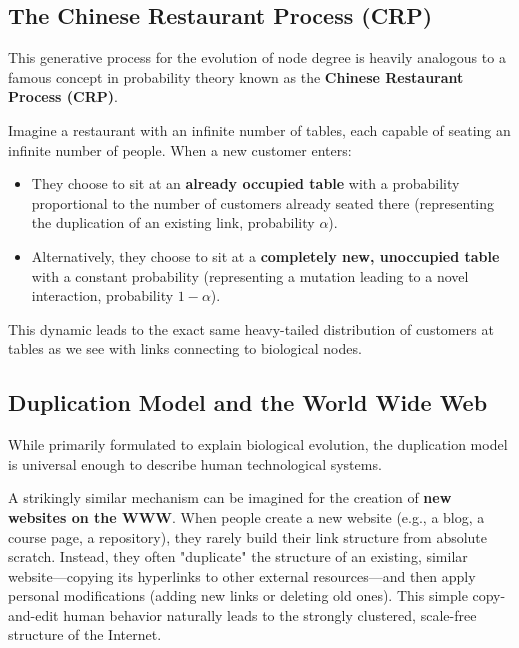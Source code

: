 \subsection{The Chinese Restaurant Process (CRP)}
This generative process for the evolution of node degree is heavily analogous to a famous concept in probability theory known as the \textbf{Chinese Restaurant Process (CRP)}.

Imagine a restaurant with an infinite number of tables, each capable of seating an infinite number of people. When a new customer enters:
\begin{itemize}
    \item They choose to sit at an \textbf{already occupied table} with a probability proportional to the number of customers already seated there (representing the duplication of an existing link, probability \( \alpha \)).
    \item Alternatively, they choose to sit at a \textbf{completely new, unoccupied table} with a constant probability (representing a mutation leading to a novel interaction, probability \( 1 - \alpha \)).
\end{itemize}
This dynamic leads to the exact same heavy-tailed distribution of customers at tables as we see with links connecting to biological nodes.

\subsection{Duplication Model and the World Wide Web}
While primarily formulated to explain biological evolution, the duplication model is universal enough to describe human technological systems.

A strikingly similar mechanism can be imagined for the creation of \textbf{new websites on the WWW}. When people create a new website (e.g., a blog, a course page, a repository), they rarely build their link structure from absolute scratch. Instead, they often "duplicate" the structure of an existing, similar website—copying its hyperlinks to other external resources—and then apply personal modifications (adding new links or deleting old ones). This simple copy-and-edit human behavior naturally leads to the strongly clustered, scale-free structure of the Internet.
